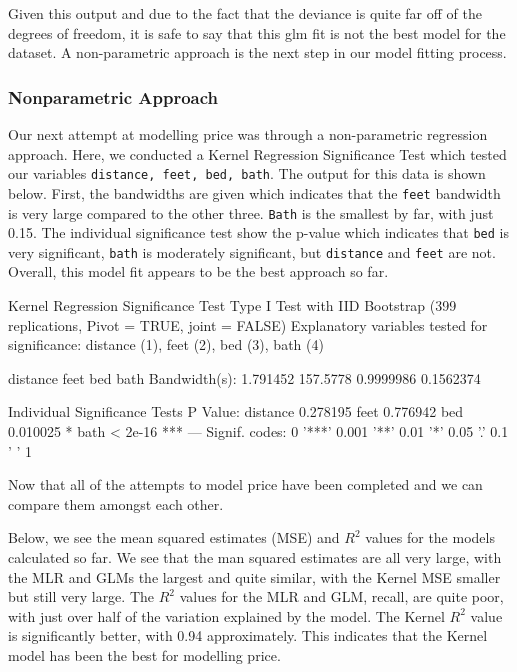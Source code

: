 \documentclass[11pt, a4paper]{article}
\begin{document}
Given this output and due to the fact that the deviance is quite far off of the degrees of freedom, it is safe to say that this glm fit is not the best model for the dataset. A non-parametric approach is the next step in our model fitting process. 


\subsubsection{Nonparametric Approach}

Our next attempt at modelling price was through a non-parametric regression approach. Here, we conducted a Kernel Regression Significance Test which tested our variables \texttt{distance, feet, bed, bath}. The output for this data is shown below. First, the bandwidths are given which indicates that the \texttt{feet} bandwidth is very large compared to the other three. \texttt{Bath} is the smallest by far, with just 0.15. The individual significance test show the p-value which indicates that \texttt{bed} is very significant, \texttt{bath} is moderately significant, but \texttt{distance} and \texttt{feet} are not. Overall, this model fit appears to be the best approach so far.




\begin{Schunk}
\begin{Soutput}
Kernel Regression Significance Test
Type I Test with IID Bootstrap (399 replications, Pivot = TRUE, joint = FALSE)
Explanatory variables tested for significance:
distance (1), feet (2), bed (3), bath (4)

              distance     feet       bed      bath
Bandwidth(s): 1.791452 157.5778 0.9999986 0.1562374

Individual Significance Tests
P Value: 
distance 0.278195  
feet     0.776942  
bed      0.010025 * 
bath     < 2e-16 ***
---
Signif. codes:  0 '***' 0.001 '**' 0.01 '*' 0.05 '.' 0.1 ' ' 1
\end{Soutput}
\end{Schunk}

Now that all of the attempts to model price have been completed and we can compare them amongst each other.

Below, we see the mean squared estimates (MSE) and $R^2$ values for the models calculated so far. We see that the man squared estimates are all very large, with the MLR and GLMs the largest and quite similar, with the Kernel MSE smaller but still very large. The $R^2$ values for the MLR and GLM, recall, are quite poor, with just over half of the variation explained by the model. The Kernel $R^2$ value is significantly better, with 0.94 approximately. This indicates that the Kernel model has been the best for modelling price. 
\end{document}
